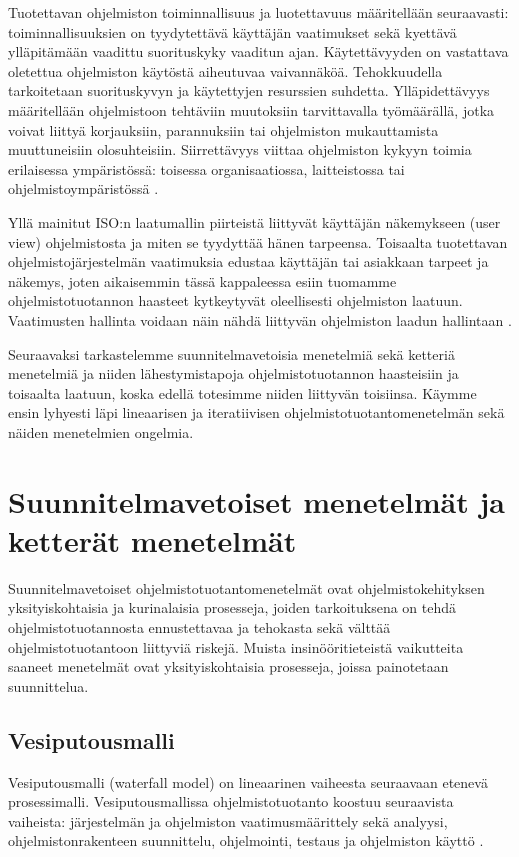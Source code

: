 \documentclass[finnish]{tktltiki2}
\theoremstyle{definition}
\theoremstyle{remark}
\begin{document}
Tuotettavan ohjelmiston toiminnallisuus ja luotettavuus määritellään seuraavasti: toiminnallisuuksien on tyydytettävä käyttäjän vaatimukset sekä kyettävä ylläpitämään vaadittu suorituskyky vaaditun ajan. Käytettävyyden on vastattava oletettua ohjelmiston käytöstä aiheutuvaa vaivannäköä. Tehokkuudella tarkoitetaan suorituskyvyn ja käytettyjen resurssien suhdetta. Yllä\-pidettävyys määritellään ohjelmistoon tehtäviin muutoksiin tarvittavalla työmäärällä, jotka voivat liittyä korjauksiin, parannuksiin tai ohjelmiston mukauttamista muuttuneisiin olosuhteisiin. Siirrettävyys viittaa ohjelmiston kykyyn toimia erilaisessa ympäristössä: toisessa organisaatiossa, laitteistossa tai ohjelmistoympäristössä \cite{KIP96}.

Yllä mainitut ISO:n laatumallin piirteistä liittyvät käyttäjän näkemykseen (user view) ohjelmistosta ja miten se tyydyttää hänen tarpeensa. Toisaalta tuotettavan ohjelmistojärjestelmän vaatimuksia edustaa käyttäjän tai asiakkaan tarpeet ja näkemys, joten aikaisemmin tässä kappaleessa esiin tuomamme ohjelmistotuotannon haasteet kytkeytyvät oleellisesti ohjelmiston laatuun. Vaatimusten hallinta voidaan näin nähdä liittyvän ohjelmiston laadun hallintaan \cite{KIP96}. 

Seuraavaksi tarkastelemme suunnitelmavetoisia menetelmiä sekä ketteriä menetelmiä ja niiden lähestymis\-tapoja ohjelmistotuotannon haasteisiin ja toisaalta laatuun, koska edellä totesimme niiden liittyvän toisiinsa. Käymme ensin lyhyesti läpi lineaarisen ja iteratiivisen ohjelmistotuotantomenetelmän sekä näiden menetelmien ongelmia.

\section{Suunnitelmavetoiset menetelmät ja ketterät menetelmät}

Suunnitelmavetoiset ohjelmistotuotantomenetelmät ovat ohjelmistokehityksen yksityiskohtaisia ja kurinalaisia prosesseja, joiden tarkoituksena on tehdä ohjelmistotuotannosta ennustettavaa ja tehokasta sekä välttää ohjelmistotuotantoon liittyviä riskejä. Muista insinööritieteistä vaikutteita saaneet menetelmät ovat yksityiskohtaisia prosesseja, joissa painotetaan suunnittelua\cite{FOW01a}.

\subsection{Vesiputousmalli}

Vesiputousmalli (waterfall model) on lineaarinen vaiheesta seuraavaan etenevä prosessimalli. Vesiputousmallissa ohjelmistotuotanto koostuu seuraavista vaiheista: järjestelmän ja ohjelmiston vaatimusmäärittely sekä analyysi, ohjelmistonrakenteen suunnittelu, ohjelmointi, testaus ja ohjelmiston käyttö \cite{ROY70}.
\end{document}
